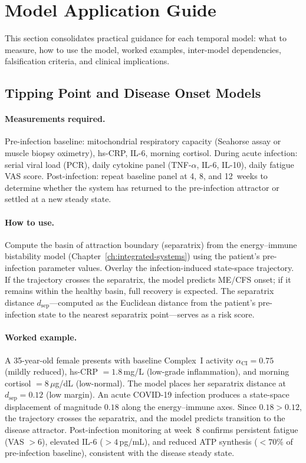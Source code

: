\section{Model Application Guide}
\label{sec:temporal-model-application}

This section consolidates practical guidance for each temporal model: what to measure, how to use the model, worked examples, inter-model dependencies, falsification criteria, and clinical implications.

\subsection{Tipping Point and Disease Onset Models}

\paragraph{Measurements required.}
Pre-infection baseline: mitochondrial respiratory capacity (Seahorse assay or muscle biopsy oximetry), hs-CRP, IL-6, morning cortisol. During acute infection: serial viral load (PCR), daily cytokine panel (TNF-$\alpha$, IL-6, IL-10), daily fatigue VAS score. Post-infection: repeat baseline panel at 4, 8, and 12~weeks to determine whether the system has returned to the pre-infection attractor or settled at a new steady state.

\paragraph{How to use.}
Compute the basin of attraction boundary (separatrix) from the energy--immune bistability model (Chapter~\ref{ch:integrated-systems}) using the patient's pre-infection parameter values. Overlay the infection-induced state-space trajectory. If the trajectory crosses the separatrix, the model predicts ME/CFS onset; if it remains within the healthy basin, full recovery is expected. The separatrix distance $d_{\text{sep}}$---computed as the Euclidean distance from the patient's pre-infection state to the nearest separatrix point---serves as a risk score.

\paragraph{Worked example.}
A 35-year-old female presents with baseline Complex~I activity $\alpha_{\text{CI}} = 0.75$ (mildly reduced), hs-CRP $= 1.8$\,mg/L (low-grade inflammation), and morning cortisol $= 8$\,$\mu$g/dL (low-normal). The model places her separatrix distance at $d_{\text{sep}} = 0.12$ (low margin). An acute COVID-19 infection produces a state-space displacement of magnitude $0.18$ along the energy--immune axes. Since $0.18 > 0.12$, the trajectory crosses the separatrix, and the model predicts transition to the disease attractor. Post-infection monitoring at week~8 confirms persistent fatigue (VAS $> 6$), elevated IL-6 ($> 4$\,pg/mL), and reduced ATP synthesis ($< 70\%$ of pre-infection baseline), consistent with the disease steady state.

